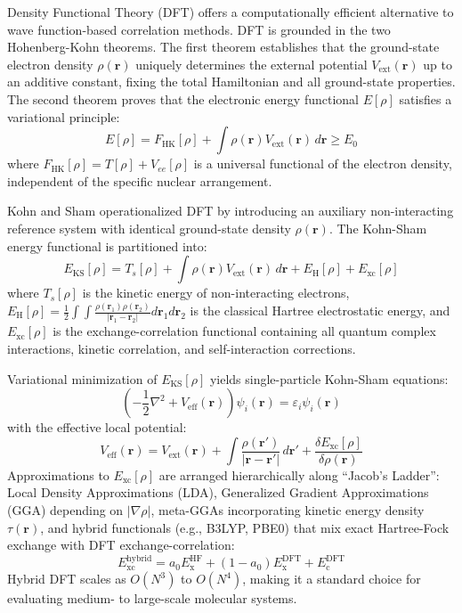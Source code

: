 \documentclass[12pt]{article}
\begin{document}
Density Functional Theory (DFT) offers a computationally efficient alternative to wave function-based correlation methods. DFT is grounded in the two Hohenberg-Kohn theorems. The first theorem establishes that the ground-state electron density $\rho(\mathbf{r})$ uniquely determines the external potential $V_{\text{ext}}(\mathbf{r})$ up to an additive constant, fixing the total Hamiltonian and all ground-state properties. The second theorem proves that the electronic energy functional $E[\rho]$ satisfies a variational principle:
\begin{equation}
E[\rho] = F_{\text{HK}}[\rho] + \int \rho(\mathbf{r}) V_{\text{ext}}(\mathbf{r}) \, d\mathbf{r} \ge E_0
\end{equation}
where $F_{\text{HK}}[\rho] = T[\rho] + V_{ee}[\rho]$ is a universal functional of the electron density, independent of the specific nuclear arrangement.

Kohn and Sham operationalized DFT by introducing an auxiliary non-interacting reference system with identical ground-state density $\rho(\mathbf{r})$. The Kohn-Sham energy functional is partitioned into:
\begin{equation}
E_{\text{KS}}[\rho] = T_s[\rho] + \int \rho(\mathbf{r}) V_{\text{ext}}(\mathbf{r}) \, d\mathbf{r} + E_{\text{H}}[\rho] + E_{\text{xc}}[\rho]
\end{equation}
where $T_s[\rho]$ is the kinetic energy of non-interacting electrons, $E_{\text{H}}[\rho] = \frac{1}{2} \int \int \frac{\rho(\mathbf{r}_1)\rho(\mathbf{r}_2)}{|\mathbf{r}_1 - \mathbf{r}_2|} d\mathbf{r}_1 d\mathbf{r}_2$ is the classical Hartree electrostatic energy, and $E_{\text{xc}}[\rho]$ is the exchange-correlation functional containing all quantum complex interactions, kinetic correlation, and self-interaction corrections.

Variational minimization of $E_{\text{KS}}[\rho]$ yields single-particle Kohn-Sham equations:
\begin{equation}
\left( -\frac{1}{2}\nabla^2 + V_{\text{eff}}(\mathbf{r}) \right) \psi_i(\mathbf{r}) = \varepsilon_i \psi_i(\mathbf{r})
\end{equation}
with the effective local potential:
\begin{equation}
V_{\text{eff}}(\mathbf{r}) = V_{\text{ext}}(\mathbf{r}) + \int \frac{\rho(\mathbf{r}')}{|\mathbf{r} - \mathbf{r}'|} \, d\mathbf{r}' + \frac{\delta E_{\text{xc}}[\rho]}{\delta \rho(\mathbf{r})}
\end{equation}
Approximations to $E_{\text{xc}}[\rho]$ are arranged hierarchically along ``Jacob's Ladder'': Local Density Approximations (LDA), Generalized Gradient Approximations (GGA) depending on $|\nabla \rho|$, meta-GGAs incorporating kinetic energy density $\tau(\mathbf{r})$, and hybrid functionals (e.g., B3LYP, PBE0) that mix exact Hartree-Fock exchange with DFT exchange-correlation:
\begin{equation}
E_{\text{xc}}^{\text{hybrid}} = a_0 E_{\text{x}}^{\text{HF}} + (1-a_0) E_{\text{x}}^{\text{DFT}} + E_{\text{c}}^{\text{DFT}}
\end{equation}
Hybrid DFT scales as $O(N^3)$ to $O(N^4)$, making it a standard choice for evaluating medium- to large-scale molecular systems.
\end{document}
